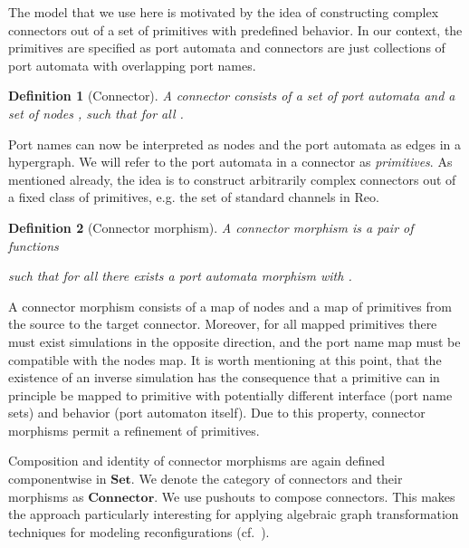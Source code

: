 \documentclass[copyright,creativecommons]{eptcs}
\newtheorem{definition}{Definition}
\newcommand{\Set}{\ensuremath{\mathbf{Set}}}
\newcommand{\Connector}{\ensuremath{\mathbf{Connector}}}
\begin{document}
The model that we use here is motivated by the 
idea of constructing complex connectors out of 
a set of primitives with predefined behavior.
In our context, the primitives are specified
as port automata and connectors are just
collections of port automata with overlapping
port names.
\begin{definition}[Connector] \label{def:connector}
A connector  consists of a set of port 
automata  and a set of nodes , such that  for all
.
\end{definition}
Port names can now be interpreted as nodes and the port automata
as edges in a hypergraph. We will refer to the port automata
in a connector as \emph{primitives}. As mentioned already,
the idea is to construct arbitrarily complex connectors 
out of a fixed class of primitives, e.g. the set of 
standard channels in Reo.
\begin{definition}[Connector morphism] \label{def:connector-morphism}
A connector morphism  is a pair of functions

such that for all  there exists a port automata
morphism  with .
\end{definition}
A connector morphism consists of a map of nodes and a map of primitives 
from the source to the target connector.
Moreover, for all mapped primitives there must exist simulations in the
opposite direction, and the port name map must be compatible with the
nodes map.
It is worth mentioning at this point, that the existence of 
an inverse simulation has the consequence that a primitive can 
in principle be mapped to primitive with potentially
different interface (port name sets) and behavior 
(port automaton itself). Due to this property, connector morphisms 
permit a refinement of primitives.

Composition and identity of connector morphisms are again defined 
componentwise in \Set. We denote the category of connectors and their
morphisms as {\Connector}. 
We use pushouts to compose connectors. This makes the approach particularly
interesting for applying algebraic graph transformation techniques for modeling
reconfigurations (cf.~\cite{KMLA10,KAV09}). 
\end{document}
